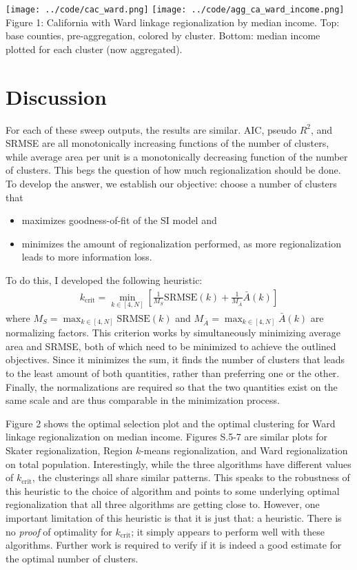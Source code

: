 \documentclass{article}
\begin{document}
    \begin{center}
        \texttt{[image: ../code/cac\_ward.png]} \texttt{[image: ../code/agg\_ca\_ward\_income.png]} \\
        Figure 1: California with Ward linkage regionalization by median income. Top: base counties, pre-aggregation, colored by cluster. Bottom: median income plotted for each cluster (now aggregated).
    \end{center}

    \section{Discussion} \label{sec:discuss}
    For each of these sweep outputs, the results are similar. AIC, pseudo $R^2$, and SRMSE are all monotonically increasing functions of the number of clusters, while average area per unit is a monotonically decreasing function of the number of clusters. This begs the question of how much regionalization should be done. To develop the answer, we establish our objective: choose a number of clusters that
    \begin{itemize}
        \item maximizes goodness-of-fit of the SI model and
        \item minimizes the amount of regionalization performed, as more regionalization leads to more information loss.
    \end{itemize} To do this, I developed the following heuristic: \begin{align*}
        k_\text{crit} = \min_{k \in [4, N]} \left[\frac{1}{M_S}\mathrm{SRMSE}(k) + \frac{1}{M_{\bar{A}}}\bar{A}(k)\right]
    \end{align*} where $M_S = \max_{k \in [4, N]} \mathrm{SRMSE}(k)$ and $M_{\bar{A}} = \max_{k \in [4, N]} \bar{A}(k)$ are normalizing factors. This criterion works by simultaneously minimizing average area and SRMSE, both of which need to be minimized to achieve the outlined objectives. Since it minimizes the sum, it finds the number of clusters that leads to the least amount of both quantities, rather than preferring one or the other. Finally, the normalizations are required so that the two quantities exist on the same scale and are thus comparable in the minimization process. 

    Figure 2 shows the optimal selection plot and the optimal clustering for Ward linkage regionalization on median income. Figures S.5-7 are similar plots for Skater regionalization, Region $k$-means regionalization, and Ward regionalization on total population. Interestingly, while the three algorithms have different values of $k_\text{crit}$, the clusterings all share similar patterns. This speaks to the robustness of this heuristic to the choice of algorithm and points to some underlying optimal regionalization that all three algorithms are getting close to. However, one important limitation of this heuristic is that it is just that: a heuristic. There is no \emph{proof} of optimality for $k_\text{crit}$; it simply appears to perform well with these algorithms. Further work is required to verify if it is indeed a good estimate for the optimal number of clusters.
\end{document}
